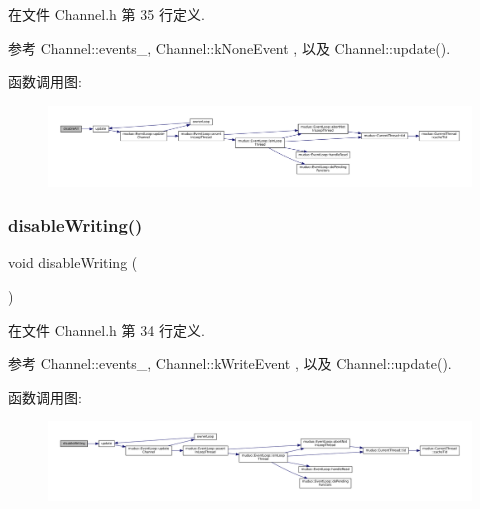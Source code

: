 在文件 Channel.\+h 第 35 行定义.



参考 Channel\+::events\+\_\+, Channel\+::k\+None\+Event , 以及 Channel\+::update().

函数调用图\+:
\nopagebreak
\begin{figure}[H]
\begin{center}
\leavevmode
\includegraphics[width=350pt]{classmuduo_1_1Channel_a238885c747f586049b766fa4fcd5ec12_cgraph}
\end{center}
\end{figure}
\mbox{\label{classmuduo_1_1Channel_a97cbc4c0678234e62a4a9d906e064cdf}} 
\subsubsection{\texorpdfstring{disable\+Writing()}{disableWriting()}}
{\footnotesize\ttfamily void disable\+Writing (\begin{DoxyParamCaption}{ }\end{DoxyParamCaption})\hspace{0.3cm}{\ttfamily [inline]}}



在文件 Channel.\+h 第 34 行定义.



参考 Channel\+::events\+\_\+, Channel\+::k\+Write\+Event , 以及 Channel\+::update().

函数调用图\+:
\nopagebreak
\begin{figure}[H]
\begin{center}
\leavevmode
\includegraphics[width=350pt]{classmuduo_1_1Channel_a97cbc4c0678234e62a4a9d906e064cdf_cgraph}
\end{center}
\end{figure}
\mbox{\label{classmuduo_1_1Channel_ad31f735a6d5ad83203d977ad8eafb223}} 
